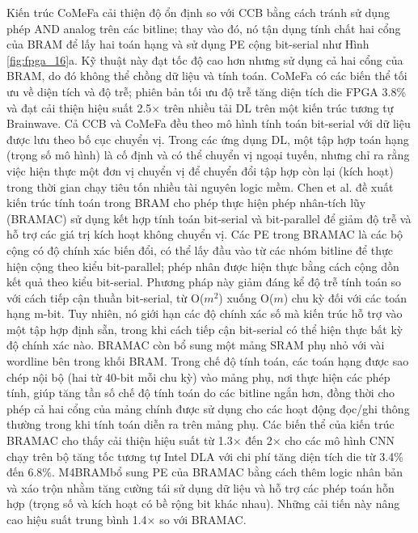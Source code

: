 \documentclass[a4paper]{article}
\begin{document}
Kiến trúc CoMeFa cải thiện độ ổn định so với CCB bằng cách tránh sử dụng phép AND analog trên các bitline; thay vào đó, nó tận dụng tính chất hai cổng của BRAM để lấy hai toán hạng và sử dụng PE cộng bit-serial như Hình \ref{fig:fpga_16}a. Kỹ thuật này đạt tốc độ cao hơn nhưng sử dụng cả hai cổng của BRAM, do đó không thể chồng dữ liệu và tính toán. CoMeFa có các biến thể tối ưu về diện tích và độ trễ; phiên bản tối ưu độ trễ tăng diện tích die FPGA 3.8\% và đạt cải thiện hiệu suất 2.5× trên nhiều tải DL trên một kiến trúc tương tự Brainwave. Cả CCB và CoMeFa đều theo mô hình tính toán bit-serial với dữ liệu được lưu theo bố cục chuyển vị. Trong các ứng dụng DL, một tập hợp toán hạng (trọng số mô hình) là cố định và có thể chuyển vị ngoại tuyến, nhưng chỉ ra rằng việc hiện thực một đơn vị chuyển vị để chuyển đổi tập hợp còn lại (kích hoạt) trong thời gian chạy tiêu tốn nhiều tài nguyên logic mềm. Chen et al. đề xuất kiến trúc tính toán trong BRAM cho phép thực hiện phép nhân-tích lũy (BRAMAC) sử dụng kết hợp tính toán bit-serial và bit-parallel để giảm độ trễ và hỗ trợ các giá trị kích hoạt không chuyển vị. Các PE trong BRAMAC là các bộ cộng có độ chính xác biến đổi, có thể lấy đầu vào từ các nhóm bitline để thực hiện cộng theo kiểu bit-parallel; phép nhân được hiện thực bằng cách cộng dồn kết quả theo kiểu bit-serial. Phương pháp này giảm đáng kể độ trễ tính toán so với cách tiếp cận thuần bit-serial, từ O($m^2$) xuống O($m$) chu kỳ đối với các toán hạng m-bit. Tuy nhiên, nó giới hạn các độ chính xác số mà kiến trúc hỗ trợ vào một tập hợp định sẵn, trong khi cách tiếp cận bit-serial có thể hiện thực bất kỳ độ chính xác nào. BRAMAC còn bổ sung một mảng SRAM phụ nhỏ với vài wordline bên trong khối BRAM. Trong chế độ tính toán, các toán hạng được sao chép nội bộ (hai từ 40-bit mỗi chu kỳ) vào mảng phụ, nơi thực hiện các phép tính, giúp tăng tần số chế độ tính toán do các bitline ngắn hơn, đồng thời cho phép cả hai cổng của mảng chính được sử dụng cho các hoạt động đọc/ghi thông thường trong khi tính toán diễn ra trên mảng phụ. Các biến thể của kiến trúc BRAMAC cho thấy cải thiện hiệu suất từ 1.3× đến 2× cho các mô hình CNN chạy trên bộ tăng tốc tương tự Intel DLA với chi phí tăng diện tích die từ 3.4\% đến 6.8\%. M4BRAMbổ sung PE của BRAMAC bằng cách thêm logic nhân bản và xáo trộn nhằm tăng cường tái sử dụng dữ liệu và hỗ trợ các phép toán hỗn hợp (trọng số và kích hoạt có bề rộng bit khác nhau). Những cải tiến này nâng cao hiệu suất trung bình 1.4× so với BRAMAC.
\end{document}
